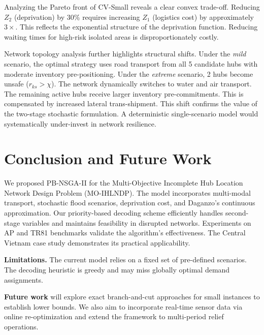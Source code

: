\documentclass{llncs}
\begin{document}
Analyzing the Pareto front of CV-Small reveals a clear convex trade-off. Reducing $Z_2$ (deprivation) by 30\% requires increasing $Z_1$ (logistics cost) by approximately $3\times$. This reflects the exponential structure of the deprivation function. Reducing waiting times for high-risk isolated areas is disproportionately costly.



Network topology analysis further highlights structural shifts. Under the \textit{mild} scenario, the optimal strategy uses road transport from all 5 candidate hubs with moderate inventory pre-positioning. Under the \textit{extreme} scenario, 2 hubs become unsafe ($r_{ks} > \chi$). The network dynamically switches to water and air transport. The remaining active hubs receive larger inventory pre-commitments. This is compensated by increased lateral trans-shipment. This shift confirms the value of the two-stage stochastic formulation. A deterministic single-scenario model would systematically under-invest in network resilience.

\section{Conclusion and Future Work}

We proposed PB-NSGA-II for the Multi-Objective Incomplete Hub Location Network Design Problem (MO-IHLNDP). The model incorporates multi-modal transport, stochastic flood scenarios, deprivation cost, and Daganzo's continuous approximation. Our priority-based decoding scheme efficiently handles second-stage variables and maintains feasibility in disrupted networks. Experiments on AP and TR81 benchmarks validate the algorithm's effectiveness. The Central Vietnam case study demonstrates its practical applicability.

\textbf{Limitations.} The current model relies on a fixed set of pre-defined scenarios. The decoding heuristic is greedy and may miss globally optimal demand assignments. 

\textbf{Future work} will explore exact branch-and-cut approaches for small instances to establish lower bounds. We also aim to incorporate real-time sensor data via online re-optimization and extend the framework to multi-period relief operations.
\end{document}
